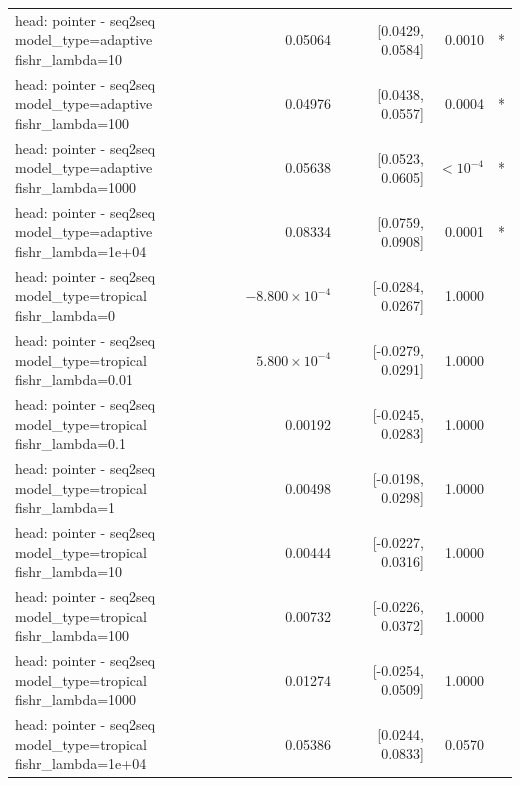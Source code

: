 \documentclass[10pt]{article}
\makeatletter
\newcommand{\stackcell}[1]{\begin{tabular}[t]{@{}l@{}}#1\end{tabular}}
\makeatother
\begin{document}
{\begin{longtable}{lrrrl}
\stackcell{head: pointer - seq2seq\\\footnotesize model\_type=adaptive fishr\_lambda=10 } & 0.05064 & [0.0429, 0.0584] & 0.0010 & *\\
\stackcell{head: pointer - seq2seq\\\footnotesize model\_type=adaptive fishr\_lambda=100 } & 0.04976 & [0.0438, 0.0557] & 0.0004 & *\\
\stackcell{head: pointer - seq2seq\\\footnotesize model\_type=adaptive fishr\_lambda=1000 } & 0.05638 & [0.0523, 0.0605] & $<10^{-4}$ & *\\
\stackcell{head: pointer - seq2seq\\\footnotesize model\_type=adaptive fishr\_lambda=1e+04 } & 0.08334 & [0.0759, 0.0908] & 0.0001 & *\\
\stackcell{head: pointer - seq2seq\\\footnotesize model\_type=tropical fishr\_lambda=0 } & $-8.800\times10^{-4}$ & [-0.0284, 0.0267] & 1.0000 & \\
\stackcell{head: pointer - seq2seq\\\footnotesize model\_type=tropical fishr\_lambda=0.01 } & $5.800\times10^{-4}$ & [-0.0279, 0.0291] & 1.0000 & \\
\stackcell{head: pointer - seq2seq\\\footnotesize model\_type=tropical fishr\_lambda=0.1 } & 0.00192 & [-0.0245, 0.0283] & 1.0000 & \\
\stackcell{head: pointer - seq2seq\\\footnotesize model\_type=tropical fishr\_lambda=1 } & 0.00498 & [-0.0198, 0.0298] & 1.0000 & \\
\stackcell{head: pointer - seq2seq\\\footnotesize model\_type=tropical fishr\_lambda=10 } & 0.00444 & [-0.0227, 0.0316] & 1.0000 & \\
\stackcell{head: pointer - seq2seq\\\footnotesize model\_type=tropical fishr\_lambda=100 } & 0.00732 & [-0.0226, 0.0372] & 1.0000 & \\
\stackcell{head: pointer - seq2seq\\\footnotesize model\_type=tropical fishr\_lambda=1000 } & 0.01274 & [-0.0254, 0.0509] & 1.0000 & \\
\stackcell{head: pointer - seq2seq\\\footnotesize model\_type=tropical fishr\_lambda=1e+04 } & 0.05386 & [0.0244, 0.0833] & 0.0570 & \\

\end{longtable}}
\end{document}
